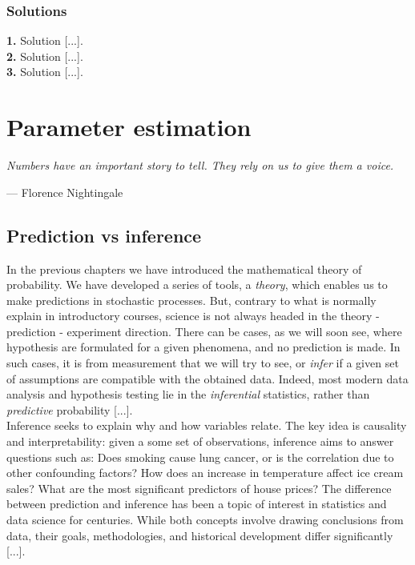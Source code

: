 \documentclass{book}
\begin{document}
\subsection*{Solutions}

\textbf{1.} Solution [...].\\

\textbf{2.} Solution [...].\\

\textbf{3.} Solution [...].\\




\chapter{Parameter estimation}

\epigraph{\textit{Numbers have an important story to tell. They rely on us to give them a voice.}}{— Florence Nightingale}

\section{Prediction vs inference}

In the previous chapters we have introduced the mathematical theory of probability. We have developed a series of tools, a \textit{theory}, which enables us to make predictions in stochastic processes. But, contrary to what is normally explain in introductory courses, science is not always headed in the theory - prediction - experiment direction. There can be cases, as we will soon see, where hypothesis are formulated for a given phenomena, and no prediction is made. In such cases, it is from measurement that we will try to see, or \textit{infer} if a given set of assumptions are compatible with the obtained data. Indeed, most modern data analysis and hypothesis testing lie in the \textit{inferential} statistics, rather than \textit{predictive} probability [...].\\

Inference seeks to explain why and how variables relate. The key idea is causality and interpretability: given a some set of observations, inference aims to answer questions such as: Does smoking cause lung cancer, or is the correlation due to other confounding factors? How does an increase in temperature affect ice cream sales? What are the most significant predictors of house prices? The difference between prediction and inference has been a topic of interest in statistics and data science for centuries. While both concepts involve drawing conclusions from data, their goals, methodologies, and historical development differ significantly [...].\\
\end{document}
